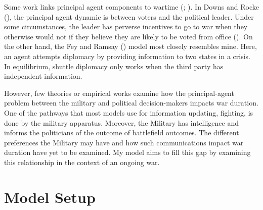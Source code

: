 \documentclass[
  12pt,
]{article}
\theoremstyle{plain}
\theoremstyle{plain}
\theoremstyle{remark}
\begin{document}
Some work links principal agent components to wartime
(;
). In
Downs and Rocke (),
the principal agent dynamic is between voters and the political leader.
Under some circumstances, the leader has perverse incentives to go to
war when they otherwise would not if they believe they are likely to be
voted from office (). On the other hand, the Fey and Ramsay
() model most closely
resembles mine. Here, an agent attempts diplomacy by providing
information to two states in a crisis. In equilibrium, shuttle diplomacy
only works when the third party has independent information.

However, few theories or empirical works examine how the principal-agent
problem between the military and political decision-makers impacts war
duration. One of the pathways that most models use for information
updating, fighting, is done by the military apparatus. Moreover, the
Military has intelligence and informs the politicians of the outcome of
battlefield outcomes. The different preferences the Military may have
and how such communications impact war duration have yet to be examined.
My model aims to fill this gap by examining this relationship in the
context of an ongoing war.

\section{Model Setup}\label{model-setup}
\end{document}
